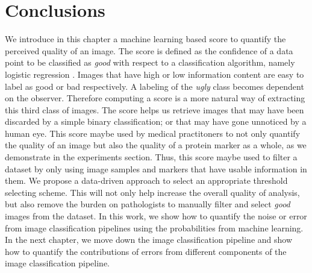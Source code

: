 \section{Conclusions}
We introduce in this chapter a machine learning based score to quantify the perceived quality of an image.  The score is defined as the confidence of a data point to be classified as \textit{good} with respect to a classification algorithm, namely logistic regression . Images that have high or low information content are easy to label as good or bad respectively. A labeling of the \textit{ugly} class becomes dependent on the observer. Therefore computing a score is a more natural way of extracting this third class of images. The score helps us retrieve images that may have been discarded by a simple binary classification; or that may have gone unnoticed by a human eye. This score maybe used by medical practitoners to not only quantify the quality of an image but also the quality of a protein marker as a whole, as we demonstrate in the experiments section. Thus, this score maybe used to filter a dataset by only using image samples and markers that have usable information in them. We propose a data-driven approach to select an appropriate threshold selecting scheme. This will not only help increase the overall quality of analysis, but also remove the burden on pathologists to manually filter and select \textit{good} images from the dataset.
In this work, we show how to quantify the noise or error from image classification pipelines using the probabilities from machine learning. In the next chapter, we move down the image classification pipeline and show how to quantify the contributions of errors from different components of the image classification pipeline. 